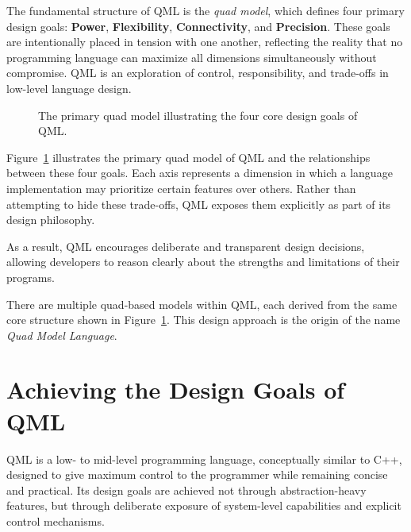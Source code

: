 \documentclass[12pt]{report}
\begin{document}
	The fundamental structure of QML is the \textit{quad model}, which defines four primary design goals: \textbf{Power}, \textbf{Flexibility}, \textbf{Connectivity}, and \textbf{Precision}. These goals are intentionally placed in tension with one another, reflecting the reality that no programming language can maximize all dimensions simultaneously without compromise. QML is an exploration of control, responsibility, and trade-offs in low-level language design.
	
	\begin{figure}[H]
		\centering
		\caption{The primary quad model illustrating the four core design goals of QML.}
		\label{fig:mainquad}
	\end{figure}
	
	Figure~\ref{fig:mainquad} illustrates the primary quad model of QML and the relationships between these four goals. Each axis represents a dimension in which a language implementation may prioritize certain features over others. Rather than attempting to hide these trade-offs, QML exposes them explicitly as part of its design philosophy.
	
	As a result, QML encourages deliberate and transparent design decisions, allowing developers to reason clearly about the strengths and limitations of their programs.
	
	\begin{notebox}
		There are multiple quad-based models within QML, each derived from the same core structure shown in Figure~\ref{fig:mainquad}. This design approach is the origin of the name \textit{Quad Model Language}.
	\end{notebox}
	
	\section{Achieving the Design Goals of QML}
	
	QML is a low- to mid-level programming language, conceptually similar to C++, designed to give maximum control to the programmer while remaining concise and practical. Its design goals are achieved not through abstraction-heavy features, but through deliberate exposure of system-level capabilities and explicit control mechanisms.
	
\end{document}
